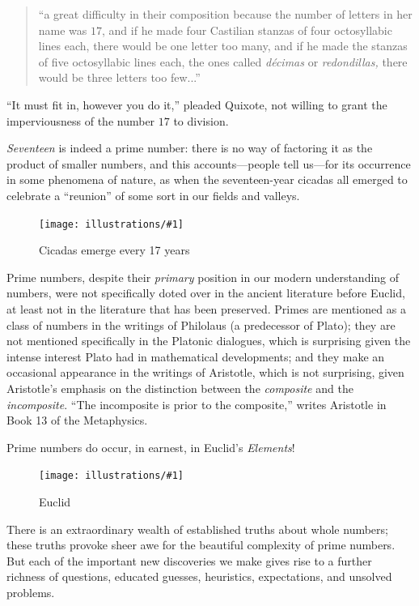 \documentclass[openany]{book}
\newcommand{\ill}[3]{%
   \begin{figure}[H]%
   \vspace{-2ex}
   \centering%
   \texttt{[image: illustrations/\#1]}%
   \caption{#3}%
   \vspace{-2ex}
    \end{figure}}
\theoremstyle{plain}
\theoremstyle{definition}
\begin{document}
\begin{quote}
  ``a great difficulty in their composition because the number of
  letters in her name was $17$, and if he made four Castilian stanzas
  of four octosyllabic lines each, there would be one letter too many,
  and if he made the stanzas of five octosyllabic lines each, the ones
  called {\em d{\'e}cimas} or {\em redondillas,} there would be three
  letters too few...''
\end{quote}

``It must fit in, however you do it,'' pleaded Quixote, not willing to
grant the imperviousness of the number $17$ to division.





{\em Seventeen} is indeed a prime number: there is no way of factoring
it as the product of smaller numbers, and this accounts---people tell
us---for its occurrence in some phenomena of nature, as when
the seventeen-year cicadas all emerged to celebrate a ``reunion'' of some
sort in our fields and valleys.

\ill{cicada}{.35}{Cicadas emerge every 17 years}




Prime numbers, despite their {\em primary} position in our modern
understanding of numbers, were not specifically doted over in the
ancient literature before Euclid, at least not in the literature that
has been preserved. Primes are mentioned as a class of numbers in the
writings of Philolaus (a predecessor of Plato); they are not mentioned
specifically in the Platonic dialogues, which is surprising
given the intense interest Plato had in mathematical developments; and
they make an occasional appearance in the writings of Aristotle, which
is not surprising, given Aristotle's emphasis on the distinction
between the {\em composite} and the {\em incomposite}. ``The
incomposite is prior to the composite,'' writes Aristotle in Book 13 of
the Metaphysics.


Prime numbers do occur, in earnest, in  Euclid's  {\it Elements}!


\ill{euclid}{.35}{Euclid}


There is an extraordinary wealth of established truths about whole
numbers; these truths provoke sheer awe for the beautiful complexity
of prime numbers. But each of the important new discoveries we make
gives rise to a further richness of questions, educated guesses,
heuristics, expectations, and unsolved problems.
\end{document}
